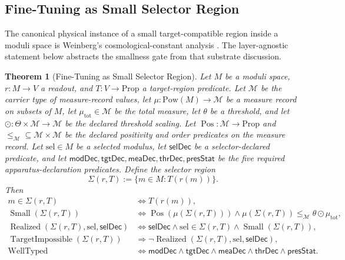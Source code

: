 \documentclass[11pt]{article}
\newtheorem{theorem}{Theorem}[section]
\theoremstyle{definition}
\begin{document}
\subsection{Fine-Tuning as Small Selector Region}\label{sec:self-reference-limits:fine-tuning}

The canonical physical instance of a small target-compatible region
inside a moduli space is Weinberg's cosmological-constant analysis
\citep{Weinberg1989CosmologicalConstant}.  The layer-agnostic
statement below abstracts the smallness gate from that substrate
discussion.

\begin{theorem}[Fine-Tuning as Small Selector Region]\label{thm:F47}
Let \(M\) be a moduli space, \(r:M\to V\) a readout, and
\(T:V\to\mathrm{Prop}\) a target-region predicate.  Let
\(\mathcal M\) be the carrier type of measure-record values, let
\(\mu:\mathrm{Pow}(M)\to\mathcal M\) be a measure record on subsets
of \(M\), let \(\mu_{\mathrm{tot}}\in\mathcal M\) be the total
measure, let \(\theta\) be a threshold, and let
\(\odot:\Theta\times\mathcal M\to\mathcal M\) be the declared
threshold scaling.  Let \(\operatorname{Pos}:\mathcal M\to
\mathrm{Prop}\) and \({\le_{\mathcal M}}\subseteq
\mathcal M\times\mathcal M\) be the declared positivity and order
predicates on the measure record.  Let \(\mathrm{sel}\in M\) be a
selected modulus, let \(\mathsf{selDec}\) be a selector-declared
predicate, and let
\(\mathsf{modDec},\mathsf{tgtDec},\mathsf{meaDec},\mathsf{thrDec},
\mathsf{presStat}\) be the five required apparatus-declaration
predicates.  Define the selector region
\[
  \Sigma(r,T):=\{m\in M:T(r(m))\}.
\]
Then
\begin{align*}
  m\in\Sigma(r,T)
  &\iff
  T(r(m)),\\
  \operatorname{Small}(\Sigma(r,T))
  &\iff
  \operatorname{Pos}(\mu(\Sigma(r,T)))
  \wedge
  \mu(\Sigma(r,T))\le_{\mathcal M}\theta\odot\mu_{\mathrm{tot}},\\
  \operatorname{Realized}(\Sigma(r,T),\mathrm{sel},\mathsf{selDec})
  &\iff
  \mathsf{selDec}
  \wedge
  \mathrm{sel}\in\Sigma(r,T)
  \wedge
  \operatorname{Small}(\Sigma(r,T)),\\
  \operatorname{TargetImpossible}(\Sigma(r,T))
  &\Longrightarrow
  \neg\operatorname{Realized}(\Sigma(r,T),\mathrm{sel},\mathsf{selDec}),\\
  \operatorname{WellTyped}
  &\iff
  \mathsf{modDec}\wedge\mathsf{tgtDec}\wedge\mathsf{meaDec}
  \wedge\mathsf{thrDec}\wedge\mathsf{presStat}.
\end{align*}
\end{theorem}
\end{document}

